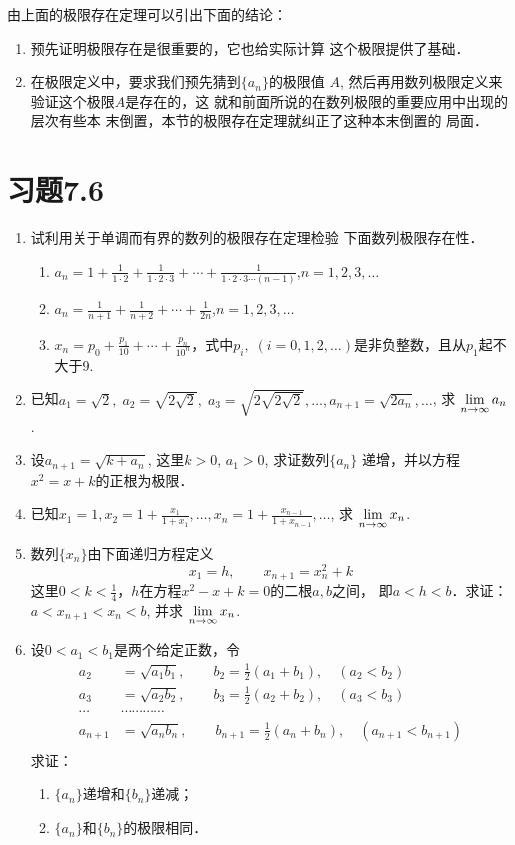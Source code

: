 由上面的极限存在定理可以引出下面的结论：
\begin{enumerate}
    \item 预先证明极限存在是很重要的，它也给实际计算
这个极限提供了基础．
\item 在极限定义中，要求我们预先猜到$\{a_n\}$的极限值
$A$, 然后再用数列极限定义来验证这个极限$A$是存在的，这
就和前面所说的在数列极限的重要应用中出现的层次有些本
末倒置，本节的极限存在定理就纠正了这种本末倒置的
局面．
\end{enumerate}

\section*{习题7.6}
\begin{enumerate}
    \item 试利用关于单调而有界的数列的极限存在定理检验
    下面数列极限存在性．
\begin{enumerate}
    \item $a_n=1+\frac{1}{1\cdot 2}+\frac{1}{1\cdot 2\cdot 3}+\cdots+\frac{1}{1\cdot 2\cdot 3\cdots (n-1)}$,\quad $n=1,2,3,\ldots$
    \item $a_n=\frac{1}{n+1}+\frac{1}{n+2}+\cdots +\frac{1}{2n}$,\quad $n=1,2,3,\ldots$
    \item $x_n=p_0+\frac{p_1}{10}+\cdots +\frac{p_n}{10^n}$，式中$p_i,\; (i=0,1,2,\ldots)$是非负整数，且从$p_1$起不大于9.
\end{enumerate}
\item 已知$a_1=\sqrt{2},\; a_2=\sqrt{2\sqrt{2}},\; a_3=\sqrt{2\sqrt{2\sqrt{2}}},\ldots,a_{n+1}=\sqrt{2a_n},\ldots$, 求 $\displaystyle\lim_{n\to\infty}a_n$.
\item 设$a_{n+1}=\sqrt{k+a_n}$, 这里$k>0$, $a_1>0$, 求证数列$\{a_n\}$
递增，并以方程$x^2=x+k$的正根为极限．
\item 已知$x_1=1,x_2=1+\frac{x_1}{1+x_1},\ldots,x_n=1+\frac{x_{n-1}}{1+x_{n-1}},\ldots$, 求 $\displaystyle\lim_{n\to\infty}x_n$.

\item 数列$\{x_n\}$由下面递归方程定义
\[x_1=h,\qquad x_{n+1}=x_n^2+k\]
这里$0<k<\frac{1}{4}$，$h$在方程$x^2-x+k=0$的二根$a,b$之间，
即$a<h<b$．求证：$a<x_{n+1}<x_n<b$, 并求 $\displaystyle\lim_{n\to\infty}x_n$.

\item 设$0<a_1<b_1$是两个给定正数，令
\[\begin{split}
    a_2&=\sqrt{a_1b_1},\qquad b_2=\frac{1}{2}(a_1+b_1),\quad (a_2<b_2)\\
    a_3&=\sqrt{a_2b_2},\qquad b_3=\frac{1}{2}(a_2+ b_2),\quad (a_3<b_3)\\
\cdots &\cdots\cdots\cdots\cdots\\
    a_{n+1}&=\sqrt{a_nb_n},\qquad b_{n+1}=\frac{1}{2}(a_n+b_n),\quad (a_{n+1}<b_{n+1})\\
\end{split}\]
求证：
\begin{enumerate}
    \item $\{a_n\}$递增和$\{b_n\}$递减；
    \item $\{a_n\}$和$\{b_n\}$的极限相同．
\end{enumerate}
\end{enumerate}